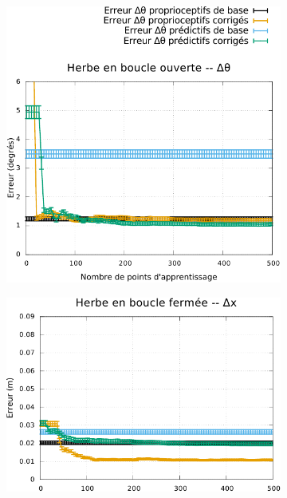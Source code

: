 \begin{figure}[htb]
\begin{subfigure}{0.29\paperwidth}
    \end{subfigure}
    \begin{subfigure}{0.29\paperwidth}
        \centering
        \includegraphics[type=pdf,ext=.pdf,read=.pdf,width=1.0\linewidth]{../plot/OdometryLWPR/grass_open_convergence_yaw}
    \end{subfigure}
    \vspace{0.1cm}
    \newline
    \begin{subfigure}{0.29\paperwidth}
        \centering
        \includegraphics[type=pdf,ext=.pdf,read=.pdf,width=1.0\linewidth]{../plot/OdometryLWPR/grass_close_convergence_x}

\end{subfigure}
\end{figure}
